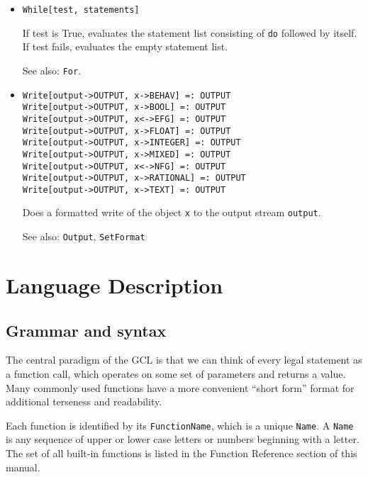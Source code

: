 \begin{itemize}

\item 
\protect \large \begin{verbatim}
While[test, statements]
\end{verbatim} \normalsize
  
\bd
If test is True, evaluates the statement list consisting of
\verb+do+ followed by itself.  If test fails, evaluates the empty
statement list.
\item
[See also:] \verb+For+.
\ed

\item
\protect \large \begin{verbatim}
Write[output->OUTPUT, x->BEHAV] =: OUTPUT 
Write[output->OUTPUT, x->BOOL] =: OUTPUT 
Write[output->OUTPUT, x<->EFG] =: OUTPUT
Write[output->OUTPUT, x->FLOAT] =: OUTPUT
Write[output->OUTPUT, x->INTEGER] =: OUTPUT
Write[output->OUTPUT, x->MIXED] =: OUTPUT
Write[output->OUTPUT, x<->NFG] =: OUTPUT
Write[output->OUTPUT, x->RATIONAL] =: OUTPUT
Write[output->OUTPUT, x->TEXT] =: OUTPUT
\end{verbatim}\normalsize

\bd
Does a formatted write of the object \verb+x+ to the
output stream \verb+output+.  
\item
[See also:] {\tt Output}, {\tt SetFormat}
\ed




\end{itemize}






\section{Language Description}

\subsection{Grammar and syntax}

The central paradigm of the GCL is that we can think of every legal
statement as a function call, which operates on some set of parameters and
returns a value.  Many commonly used functions have a more convenient
``short form'' format for additional terseness and readability.

Each function is identified by its \verb+FunctionName+, which is a
unique \verb+Name+.  A \verb+Name+ is any sequence of upper or lower
case letters or numbers beginning with a letter.  The set of all
built-in functions is listed in the Function Reference section of this
manual.

